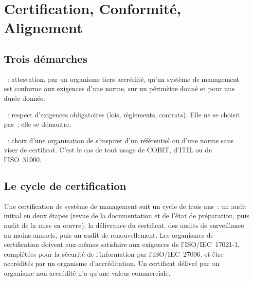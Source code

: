 \section{Certification, Conformité, Alignement}
\label{sec:c09-certification}

\subsection{Trois démarches}

\begin{boxdef}
~: attestation, par un
organisme tiers accrédité, qu'un système de management est conforme aux
exigences d'une norme, sur un périmètre donné et pour une durée donnée.

\medskip
{}~: respect d'exigences obligatoires
(lois, règlements, contrats). Elle ne se choisit pas~; elle se démontre.

\medskip
{}~: choix
d'une organisation de s'inspirer d'un référentiel ou d'une norme sans
viser de certificat. C'est le cas de tout usage de COBIT, d'ITIL ou de
l'ISO~31000.
\end{boxdef}

\subsection{Le cycle de certification}

Une certification de système de management suit un cycle de trois ans~:
un audit initial en deux étapes (revue de la documentation et de l'état
de préparation, puis audit de la mise en œuvre), la délivrance du
certificat, des audits de surveillance au moins annuels, puis un audit de
renouvellement. Les organismes de certification doivent eux-mêmes
satisfaire aux exigences de l'ISO/IEC~17021-1, complétées pour la sécurité
de l'information par l'ISO/IEC~27006, et être accrédités par un organisme
d'accréditation. Un certificat délivré par un organisme non accrédité n'a
qu'une valeur commerciale.


